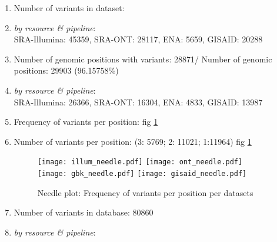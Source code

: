 \documentclass[a4paper, 10pt]{article}        %
\begin{document}
\begin{enumerate}

\item Number of variants in dataset: 
\item[] \textsl{by resource \& pipeline}:\\
SRA-Illumina: 45359, SRA-ONT: 28117, ENA: 5659, GISAID: 20288 
\item Number of genomic positions with variants: 28871/ Number of genomic positions: 29903 (96.15758\%)
\item[] \textsl{by resource \& pipeline}: \\
SRA-Illumina: 26366, SRA-ONT: 16304, ENA: 4833, GISAID: 13987 
\item Frequency of variants per position: fig \ref{fig:needle}
\item Number of variants per position: (3: 5769; 2: 11021; 1:11964) fig \ref{fig:needle}
   \begin{figure}[!htb]
     \centering
      \texttt{[image: illum\_needle.pdf]}
            \texttt{[image: ont\_needle.pdf]}
      \texttt{[image: gbk\_needle.pdf]}
      \texttt{[image: gisaid\_needle.pdf]}
    \caption{Needle plot: Frequency of variants per position per datasets}
     \label{fig:needle}
     \end{figure}
\item Number of variants in database: 80860
\item[] \textsl{by resource \& pipeline}:\\



\end{enumerate}
\end{document}
